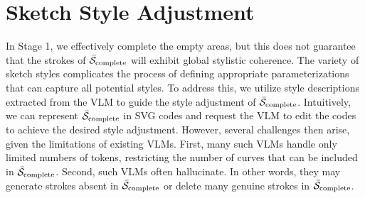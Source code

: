 \section{Sketch Style Adjustment}
\label{sec:method_step3}
In Stage 1, we effectively complete the empty areas, but this does not guarantee that the strokes of $\mathcal{\bar{S}}_{\mathrm{complete}}$ will exhibit global stylistic coherence.
The variety of sketch styles complicates the process of defining appropriate parameterizations that can capture all potential styles.
To address this, we utilize style descriptions extracted from the VLM to guide the style adjustment of $\mathcal{\bar{S}}_{\mathrm{complete}}$.
Intuitively, we can represent $\mathcal{\bar{S}}_{\mathrm{complete}}$ in SVG codes and request the VLM to edit the codes to achieve the desired style adjustment.
However, several challenges then arise, given the limitations of existing VLMs.
First, many such VLMs handle only limited numbers of tokens, restricting the number of curves that can be included in $\mathcal{\bar{S}}_{\mathrm{complete}}$.
Second, such VLMs often hallucinate.
In other words, they may generate strokes absent in $\mathcal{\bar{S}}_{\mathrm{complete}}$ or delete many genuine strokes in $\mathcal{\bar{S}}_{\mathrm{complete}}$.

